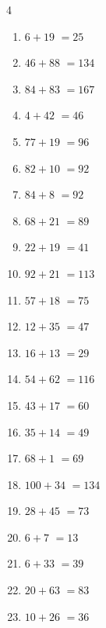 \begin{multicols}{4}
\begin{enumerate}
  \item $6+19$
        $=25$

  \item $46+88$
        $=134$

  \item $84+83$
        $=167$

  \item $4+42$
        $=46$

  \item $77+19$
        $=96$

  \item $82+10$
        $=92$

  \item $84+8$
        $=92$

  \item $68+21$
        $=89$

  \item $22+19$
        $=41$

  \item $92+21$
        $=113$

  \item $57+18$
        $=75$

  \item $12+35$
        $=47$

  \item $16+13$
        $=29$

  \item $54+62$
        $=116$

  \item $43+17$
        $=60$

  \item $35+14$
        $=49$

  \item $68+1$
        $=69$

  \item $100+34$
        $=134$

\columnbreak %

  \item $28+45$
        $=73$

  \item $6+7$
        $=13$

  \item $6+33$
        $=39$

  \item $20+63$
        $=83$

  \item $10+26$
        $=36$


\end{enumerate}
\end{multicols}
